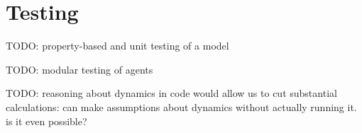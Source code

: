 \section{Testing}

TODO: property-based and unit testing of a model

TODO: modular testing of agents

TODO: reasoning about dynamics in code would allow us to cut substantial calculations: can make assumptions about dynamics without actually running it. is it even possible?

\cite{perez_testing_2017}